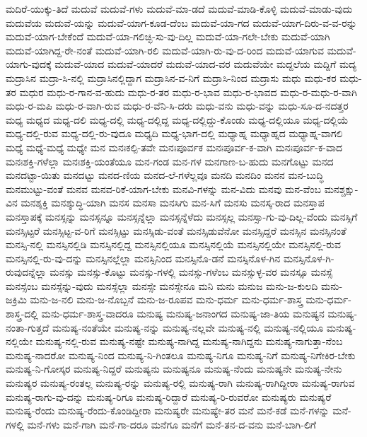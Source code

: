 {ಮದಿರೆ-ಯುಕ್ಕು-ತಿದೆ
ಮದುವೆ
ಮದುವೆ-ಗಳು
ಮದುವೆ-ಮಾ-ಡದೆ
ಮದುವೆ-ಮಾಡಿ-ಕೊಳ್ಳಿ
ಮದುವೆ-ಮಾಡು-ವುದು
ಮದುವೆಯ
ಮದುವೆ-ಯನ್ನು
ಮದುವೆ-ಯಾಗ-ಕೂಡ-ದೆಂಬ
ಮದುವೆ-ಯಾ-ಗದ
ಮದುವೆ-ಯಾಗ-ದಿರು-ವ-ವ-ರನ್ನು
ಮದುವೆ-ಯಾಗ-ಬೇಕೆಂದೆ
ಮದುವೆ-ಯಾ-ಗಲಿಚ್ಛಿ-ಸು-ವು-ದಿಲ್ಲ
ಮದುವೆ-ಯಾ-ಗಲೇ-ಬೇಕು
ಮದುವೆ-ಯಾಗಿ
ಮದುವೆ-ಯಾಗಿದ್ದ-ರೇ-ನಂತೆ
ಮದುವೆ-ಯಾಗಿ-ರಲಿ
ಮದುವೆ-ಯಾಗಿ-ರು-ವು-ದ-ರಿಂದ
ಮದುವೆ-ಯಾಗುವ
ಮದುವೆ-ಯಾಗು-ವುದಕ್ಕೆ
ಮದುವೆ-ಯಾದ
ಮದುವೆ-ಯಾದರೆ
ಮದುವೆ-ಯಾದ-ವರ
ಮದುವೆಯೇ
ಮದ್ದಲೆಯ
ಮದ್ದಿಗೆ
ಮದ್ಯ
ಮದ್ರಾಸಿನ
ಮದ್ರಾ-ಸಿ-ನಲ್ಲಿ
ಮದ್ರಾಸಿನಲ್ಲಿದ್ದಾಗ
ಮದ್ರಾಸಿನ-ವ-ನಿಗೆ
ಮದ್ರಾಸಿ-ನಿಂದ
ಮದ್ರಾಸು
ಮಧು
ಮಧು-ಕರ
ಮಧು-ತರ
ಮಧುರ
ಮಧು-ರ-ಗಾನ-ವ-ಹುದು
ಮಧು-ರ-ತರ
ಮಧು-ರ-ಭಾವ
ಮಧು-ರ-ಭಾವದ
ಮಧು-ರ-ಮಧು-ರ-ವಾಗಿ
ಮಧು-ರ-ಮಪಿ
ಮಧು-ರ-ವಾಗಿ-ರುವ
ಮಧು-ರ-ವೆನಿ-ಸಿ-ದರು
ಮಧು-ವನು
ಮಧು-ವನ್ನು
ಮಧು-ಸೂ-ದ-ನದತ್ತರ
ಮಧ್ಯ
ಮಧ್ಯದ
ಮಧ್ಯ-ದಲಿ
ಮಧ್ಯ-ದಲ್ಲಿ
ಮಧ್ಯ-ದಲ್ಲಿದ್ದ
ಮಧ್ಯ-ದಲ್ಲಿದ್ದು-ಕೊಂಡು
ಮಧ್ಯ-ದಲ್ಲಿಯೂ
ಮಧ್ಯ-ದಲ್ಲಿಯೆ
ಮಧ್ಯ-ದಲ್ಲಿ-ರುವ
ಮಧ್ಯ-ದಲ್ಲಿ-ರು-ವುದೂ
ಮಧ್ಯದಿ
ಮಧ್ಯ-ಭಾಗ-ದಲ್ಲಿ
ಮಧ್ಯಾಹ್ನ
ಮಧ್ಯಾಹ್ನದ
ಮಧ್ಯಾಹ್ನ-ವಾಗಲಿ
ಮಧ್ಯೆ
ಮಧ್ಯೆ-ಮಧ್ಯೆ
ಮಧ್ಯೇ
ಮನ
ಮನಃಕಲ್ಪಿ-ತವೇ
ಮನಃಪೂರ್ವಕ
ಮನಃಪೂರ್ವ-ಕ-ವಾಗಿ
ಮನಃಪೂರ್ವ-ಕ-ವಾದ
ಮನಃಶಕ್ತಿ-ಗಳೆಲ್ಲಾ
ಮನಃಶಕ್ತಿ-ಯಂತೆಯೂ
ಮನ-ಗಂಡ
ಮನ-ಗಳ
ಮನಗಾಣ-ಬ-ಹುದು
ಮನಗೊಟ್ಟು
ಮನದ
ಮನದಟ್ಟಾ-ಯಿತು
ಮನದಟ್ಟು
ಮನದ-ಣಿಯ
ಮನದ-ಲೆ-ಗಳೆಲ್ಲವೂ
ಮನದಿ
ಮನದಿಂ
ಮನನ
ಮನ-ಬುದ್ಧಿ
ಮನಮುಟ್ಟು-ವಂತೆ
ಮನವ
ಮನವ-ರಿಕೆ-ಯಾಗ-ಬೇಕು
ಮನವಿ-ಗಳನ್ನು
ಮನ-ವಿದು
ಮನವು
ಮನ-ವೆಂಬ
ಮನಶ್ಚಕ್ಷು-ವಿನ
ಮನಶ್ಶಕ್ತಿ
ಮನಶ್ಶುದ್ಧಿ-ಯಾಗಿ
ಮನಸ
ಮನಸಾ
ಮನಸಿಗು
ಮನ-ಸಿಗೆ
ಮನಸು
ಮನಸ್ಕ-ರಾದ
ಮನಸ್ತಾಪ
ಮನಸ್ತಾಪಕ್ಕೆ
ಮನಸ್ಸನ್ನು
ಮನಸ್ಸನ್ನೂ
ಮನಸ್ಸನ್ನೆಲ್ಲಾ
ಮನಸ್ಸನ್ನೆಳೆದು
ಮನಸ್ಸಲ್ಲ
ಮನಸ್ಸಾ-ಗು-ವು-ದಿಲ್ಲ-ವೆಂದು
ಮನಸ್ಸಿಗೆ
ಮನಸ್ಸಿಟ್ಟರೆ
ಮನಸ್ಸಿಟ್ಟ-ವ-ರಿಗೆ
ಮನಸ್ಸಿಟ್ಟು
ಮನಸ್ಸಿಡು-ವಂತೆ
ಮನಸ್ಸಿಡುವೆನೋ
ಮನಸ್ಸಿದ್ದರೆ
ಮನಸ್ಸಿನ
ಮನಸ್ಸಿನಂತೆ
ಮನಸ್ಸಿ-ನಲ್ಲಿ
ಮನಸ್ಸಿನಲ್ಲಿಡಿ
ಮನಸ್ಸಿನಲ್ಲಿದ್ದ
ಮನಸ್ಸಿನಲ್ಲಿಯೂ
ಮನಸ್ಸಿನಲ್ಲಿಯೆ
ಮನಸ್ಸಿನಲ್ಲಿಯೇ
ಮನಸ್ಸಿನಲ್ಲಿ-ರುವ
ಮನಸ್ಸಿನಲ್ಲಿ-ರು-ವು-ದನ್ನು
ಮನಸ್ಸಿನಲ್ಲೆಲ್ಲಾ
ಮನಸ್ಸಿನಿಂದ
ಮನಸ್ಸಿನೊ-ಡನೆ
ಮನಸ್ಸಿನೊಳ-ಗಿನ
ಮನಸ್ಸಿನೊಳ-ಗಿ-ರುವುದನ್ನೆಲ್ಲಾ
ಮನಸ್ಸು
ಮನಸ್ಸು-ಕೊಟ್ಟು
ಮನಸ್ಸು-ಗಳಲ್ಲಿ
ಮನಸ್ಸು-ಗಳೆಂಬ
ಮನಸ್ಸುಳ್ಳ-ವರ
ಮನಸ್ಸೂ
ಮನಸ್ಸೆ
ಮನಸ್ಸೆಂಬ
ಮನಸ್ಸೆನ್ನು-ವುದು
ಮನಸ್ಸೆಲ್ಲಾ
ಮನಸ್ಸೇ
ಮನಸ್ಸೇನೂ
ಮನಿ
ಮನು
ಮನುಜ
ಮನು-ಜ-ಕುಲದಿ
ಮನು-ಜಕ್ರಿಮಿ
ಮನು-ಜ-ನಲಿ
ಮನು-ಜ-ನೊಬ್ಬನೆ
ಮನು-ಜ-ರೂಪವ
ಮನು-ಧರ್ಮ
ಮನು-ಧರ್ಮ-ಶಾಸ್ತ್ರ
ಮನು-ಧರ್ಮ-ಶಾಸ್ತ್ರ-ದಲ್ಲಿ
ಮನು-ಧರ್ಮ-ಶಾಸ್ತ್ರ-ವಾದರೂ
ಮನುಷ್ಯ
ಮನುಷ್ಯ-ಜನಾಂಗದ
ಮನುಷ್ಯ-ಜಾ-ತಿಯ
ಮನುಷ್ಯನ
ಮನುಷ್ಯ-ನಂತಾ-ಗುತ್ತದೆ
ಮನುಷ್ಯ-ನಂತೆಯೇ
ಮನುಷ್ಯ-ನನ್ನು
ಮನುಷ್ಯ-ನಲ್ಲವೇ
ಮನುಷ್ಯ-ನಲ್ಲಿ
ಮನುಷ್ಯ-ನಲ್ಲಿಯೂ
ಮನುಷ್ಯ-ನಲ್ಲಿಯೇ
ಮನುಷ್ಯ-ನಲ್ಲಿ-ರುವ
ಮನುಷ್ಯ-ನಷ್ಟೇ
ಮನುಷ್ಯ-ನಾಗಿದ್ದ
ಮನುಷ್ಯ-ನಾಗಿದ್ದನು
ಮನುಷ್ಯ-ನಾಗುತ್ತಾ-ನೆಂಬ
ಮನುಷ್ಯ-ನಾದರೋ
ಮನುಷ್ಯ-ನಿಂದ
ಮನುಷ್ಯ-ನಿ-ಗಿಂತಲೂ
ಮನುಷ್ಯ-ನಿಗೂ
ಮನುಷ್ಯ-ನಿಗೆ
ಮನುಷ್ಯ-ನಿಗೇಕಿರ-ಬೇಕು
ಮನುಷ್ಯ-ನಿ-ಗೋಸ್ಕರ
ಮನುಷ್ಯ-ನಿದ್ದರೆ
ಮನುಷ್ಯನು
ಮನುಷ್ಯನೂ
ಮನುಷ್ಯ-ನೆಂದು
ಮನುಷ್ಯನೇ
ಮನುಷ್ಯ-ನೇನು
ಮನುಷ್ಯರ
ಮನುಷ್ಯ-ರಂತಲ್ಲ
ಮನುಷ್ಯ-ರನ್ನು
ಮನುಷ್ಯ-ರಲ್ಲಿ
ಮನುಷ್ಯ-ರಾಗಿ
ಮನುಷ್ಯ-ರಾಗಿದ್ದೀರಾ
ಮನುಷ್ಯ-ರಾಗುವ
ಮನುಷ್ಯ-ರಾಗು-ವು-ದನ್ನು
ಮನುಷ್ಯ-ರಿಗೂ
ಮನುಷ್ಯ-ರಿದ್ದಾರೆ
ಮನುಷ್ಯ-ರಿ-ರುವರೋ
ಮನುಷ್ಯರು
ಮನುಷ್ಯರೆ
ಮನುಷ್ಯ-ರೆಂದು
ಮನುಷ್ಯ-ರೆಂದು-ಕೊಂಡಿದ್ದೀರಾ
ಮನುಷ್ಯರೇ
ಮನುಷ್ಯೇ-ತರ
ಮನೆ
ಮನೆ-ಕಡೆ
ಮನೆ-ಗಳನ್ನು
ಮನೆ-ಗಳಲ್ಲಿ
ಮನೆ-ಗಳು
ಮನೆ-ಗಾಗಿ
ಮನೆ-ಗಾ-ದರೂ
ಮನೆಗೂ
ಮನೆಗೆ
ಮನೆ-ತನ-ದ-ವನು
ಮನೆ-ಬಾಗಿ-ಲಿಗೆ
}
